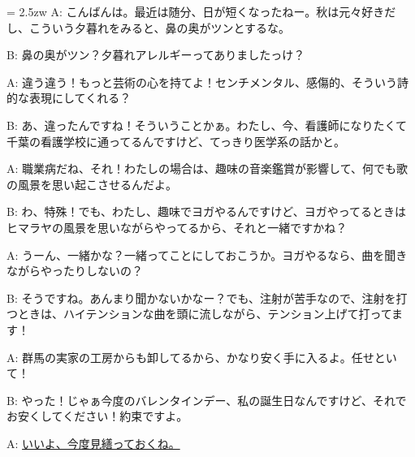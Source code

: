 \documentclass[11pt]{amsart}
\title{}
\author{}
\newenvironment{hangall}[1]{\hangindent = 2.5zw\everypar{\hangindent = 2.5zw}}{}
\begin{document}
\maketitle
\begin{hangall}{}%
A: こんばんは。最近は随分、日が短くなったねー。秋は元々好きだし、こういう夕暮れをみると、鼻の奥がツンとするな。

B: 鼻の奥がツン？夕暮れアレルギーってありましたっけ？

A: 違う違う！もっと芸術の心を持てよ！センチメンタル、感傷的、そういう詩的な表現にしてくれる？

B: あ、違ったんですね！そういうことかぁ。わたし、今、看護師になりたくて千葉の看護学校に通ってるんですけど、てっきり医学系の話かと。

A: 職業病だね、それ！わたしの場合は、趣味の音楽鑑賞が影響して、何でも歌の風景を思い起こさせるんだよ。

B: わ、特殊！でも、わたし、趣味でヨガやるんですけど、ヨガやってるときはヒマラヤの風景を思いながらやってるから、それと一緒ですかね？

A: うーん、一緒かな？一緒ってことにしておこうか。ヨガやるなら、曲を聞きながらやったりしないの？

B: そうですね。あんまり聞かないかなー？でも、注射が苦手なので、注射を打つときは、ハイテンションな曲を頭に流しながら、テンション上げて打ってます！

A: 群馬の実家の工房からも卸してるから、かなり安く手に入るよ。任せといて！

B: やった！じゃぁ今度のバレンタインデー、私の誕生日なんですけど、それでお安くしてください！約束ですよ。

A: \ul{いいよ、今度見繕っておくね。}\end{hangall}
\end{document}
